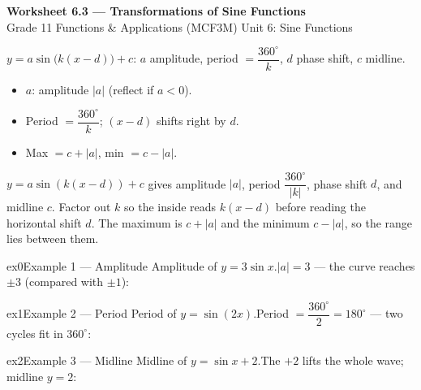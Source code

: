 \documentclass[11pt]{article}
\begin{document}
\begin{center}
{\LARGE\bfseries\color{titleblue}Worksheet 6.3 --- Transformations of Sine Functions}\\[2pt]
{\small Grade 11 Functions \& Applications (MCF3M) \textperiodcentered{} Unit 6: Sine Functions}
\end{center}

\begin{ideabox}
$y=a\sin\!\big(k(x-d)\big)+c$: $a$ amplitude, period $=\dfrac{360^\circ}{k}$, $d$ phase shift, $c$ midline.
\begin{itemize}[leftmargin=*,itemsep=2pt]
  \item $a$: amplitude $|a|$ (reflect if $a<0$).
  \item Period $=\dfrac{360^\circ}{k}$; $(x-d)$ shifts right by $d$.
  \item Max $=c+|a|$, min $=c-|a|$.
\end{itemize}
\end{ideabox}

\begin{learnbox}
$y=a\sin\!\left(k(x-d)\right)+c$ gives amplitude $|a|$, period $\dfrac{360^\circ}{|k|}$, phase shift $d$, and midline $c$.
Factor out $k$ so the inside reads $k(x-d)$ before reading the horizontal shift $d$.
The maximum is $c+|a|$ and the minimum $c-|a|$, so the range lies between them.
\end{learnbox}


\begin{example}{ex0}{Example 1 --- Amplitude}
Amplitude of $y=3\sin x$.\soln $|a|=3$ — the curve reaches $\pm3$ (compared with $\pm1$):
\end{example}

\begin{example}{ex1}{Example 2 --- Period}
Period of $y=\sin(2x)$.\soln Period $=\dfrac{360^\circ}{2}=180^\circ$ — two cycles fit in $360^\circ$:
\end{example}

\begin{example}{ex2}{Example 3 --- Midline}
Midline of $y=\sin x+2$.\soln The $+2$ lifts the whole wave; midline $y=2$:
\end{example}
\end{document}
